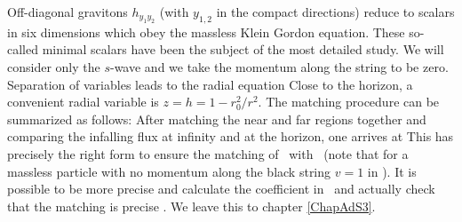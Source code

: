 
Off-diagonal gravitons $h_{y_1 y_2}$
(with $y_{1,2}$ in the compact directions) reduce
to scalars in six dimensions which obey the massless Klein
Gordon  equation.  These
so-called 
minimal scalars have been the subject of the most detailed study.
We will consider only the $s$-wave and we take the momentum along the 
string to be zero.   Separation of variables leads to the
radial equation
 Close to the horizon, a convenient radial variable is $z = h = 1 -
r_0^2/r^2$.  The matching procedure can be summarized as follows:
 After matching the near and far regions together and comparing the
infalling flux at infinity and at the horizon, one arrives at
This has precisely the right form to ensure the matching of 
\emission\ with \HawkingRadiation\  (note that for a massless particle
with no momentum along the black string $v =1$ in \HawkingRadiation ).
It is possible to be more precise and  calculate the coefficient in 
\emission\  and actually check that the matching is precise 
\cite{Das:1996wn}. We leave 
this to chapter \ref{ChapAdS3}.

